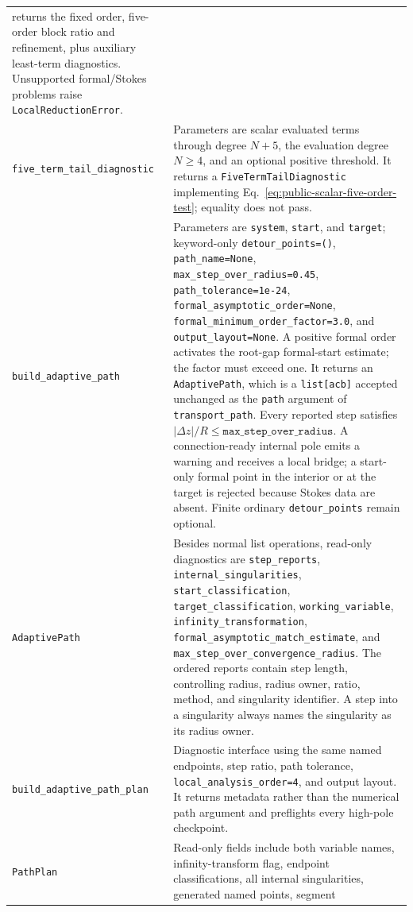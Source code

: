 \documentclass[11pt]{article}
\begin{document}
\begin{longtable}{L{0.36\textwidth}L{0.58\textwidth}}
returns the fixed order, five-order block ratio and refinement, plus auxiliary least-term diagnostics.  Unsupported formal/Stokes problems raise
\texttt{LocalReductionError}. \\
\texttt{five\_term\_tail\_diagnostic} & Parameters are scalar evaluated terms through degree
$N+5$, the evaluation degree $N\geq4$, and an optional positive threshold.  It returns a
\texttt{FiveTermTailDiagnostic} implementing
Eq.~\eqref{eq:public-scalar-five-order-test}; equality does not pass. \\
\texttt{build\_adaptive\_path} & Parameters are \texttt{system}, \texttt{start}, and
\texttt{target}; keyword-only \texttt{detour\_points=()}, \texttt{path\_name=None},
\texttt{max\_step\_over\_radius=0.45}, \texttt{path\_tolerance=1e-24},
\texttt{formal\_asymptotic\_order=None},
\texttt{formal\_minimum\_order\_factor=3.0}, and \texttt{output\_layout=None}.  A positive
formal order activates the root-gap formal-start estimate; the factor must exceed one.  It returns an \texttt{AdaptivePath}, which is a
\texttt{list[acb]} accepted unchanged as the \texttt{path} argument of
\texttt{transport\_path}.  Every reported step satisfies
$|\Delta z|/R\leq\texttt{max\_step\_over\_radius}$.  A connection-ready internal pole emits
a warning and receives a local bridge; a start-only formal point in the interior or at the
target is rejected because Stokes data are absent.  Finite ordinary
\texttt{detour\_points} remain optional. \\
\texttt{AdaptivePath} & Besides normal list operations, read-only diagnostics are
\texttt{step\_reports}, \texttt{internal\_singularities},
\texttt{start\_classification}, \texttt{target\_classification}, \texttt{working\_variable},
\texttt{infinity\_transformation}, \texttt{formal\_asymptotic\_match\_estimate}, and
\texttt{max\_step\_over\_convergence\_radius}.  The ordered reports contain step length,
controlling radius, radius owner, ratio, method, and singularity identifier.  A step into a
singularity always names the singularity as its radius owner. \\
\texttt{build\_adaptive\_path\_plan} & Diagnostic interface using the same named endpoints,
step ratio, path tolerance, \texttt{local\_analysis\_order=4}, and output layout.  It returns
metadata rather than the numerical path argument and preflights every high-pole checkpoint. \\
\texttt{PathPlan} & Read-only fields include both variable names, infinity-transform flag,
endpoint classifications, all internal singularities, generated named points, segment

\end{longtable}
\end{document}
